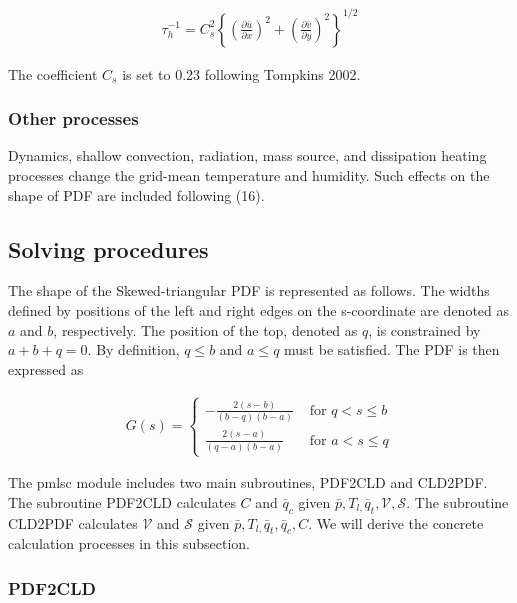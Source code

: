 \begin{eqnarray}
\tau_{h}^{-1}=C_{s}^{2}\left\{\left(\frac{\partial \bar{u}}{\partial x}\right)^{2}+\left(\frac{\partial \bar{v}}{\partial y}\right)^{2}\right\}^{1 / 2}
\end{eqnarray}

The coefficient \(C_{s}\) is set to 0.23 following Tompkins 2002.

\hypertarget{other-processes}{%
\subsubsection{Other processes}\label{other-processes}}

Dynamics, shallow convection, radiation, mass source, and dissipation
heating processes change the grid-mean temperature and humidity. Such
effects on the shape of PDF are included following (16).

\hypertarget{solving-procedures}{%
\subsection{Solving procedures}\label{solving-procedures}}

The shape of the Skewed-triangular PDF is represented as follows. The
widths defined by positions of the left and right edges on the
s-coordinate are denoted as \(a\) and \(b\), respectively. The position
of the top, denoted as \(q\), is constrained by \(a+b+q=0\). By
definition, \(q \leq b\) and \(a \leq q\) must be satisfied. The PDF is
then expressed as

\begin{eqnarray}
G(s)=\left\{\begin{array}{cl}-\frac{2(s-b)}{(b-q)(b-a)} & \text { for } q<s \leq b \\ \frac{2(s-a)}{(q-a)(b-a)} & \text { for } a<s \leq q\end{array}\right.
\end{eqnarray}

The pmlsc module includes two main subroutines, PDF2CLD and CLD2PDF. The
subroutine PDF2CLD calculates \(C\) and \(\bar{q}_{c}\) given
\(\bar{p}, T_{l,} \bar{q}_{t}, \mathcal{V}, \mathcal{S}\). The
subroutine CLD2PDF calculates \(\mathcal{V}\) and \(\mathcal{S}\) given
\(\bar{p}, T_{l,} \bar{q}_{t}, \bar{q}_{c}, C\). We will derive the
concrete calculation processes in this subsection.

\hypertarget{pdf2cld}{%
\subsubsection{PDF2CLD}\label{pdf2cld}}

